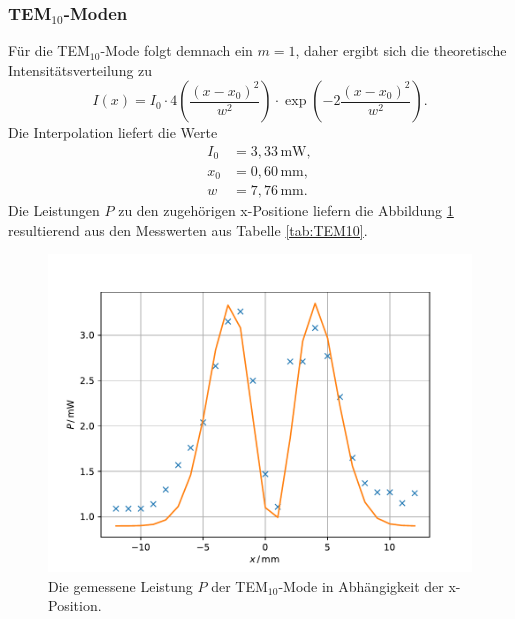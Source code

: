 \subsubsection{TEM$_{10}$-Moden}
Für die TEM$_{10}$-Mode folgt demnach ein $m=1$, daher ergibt sich die theoretische Intensitätsverteilung
zu 
\begin{equation}
    I(x)=I_0\cdot 4\left(\frac{(x-x_0)^2}{w^2}\right)\cdot\exp\left(-2\frac{(x-x_0)^2}{w^2}\right).
\end{equation}
Die Interpolation liefert die Werte
\begin{align*}
    I_0&=3,33\,\text{mW}{,}\\
    x_0&=0,60\,\text{mm}{,}\\
    w&=7,76\,\text{mm}.
\end{align*}
Die Leistungen $P$ zu den zugehörigen x-Positione liefern die Abbildung \ref{fig:TEM10} resultierend aus den Messwerten aus Tabelle \ref{tab:TEM10}.
\begin{figure}
    \center
    \includegraphics[width=\textwidth]{plots/TEM10.pdf}
    \caption{Die gemessene Leistung $P$ der TEM$_{10}$-Mode in Abhängigkeit der x-Position.}
    \label{fig:TEM10}
\end{figure}



